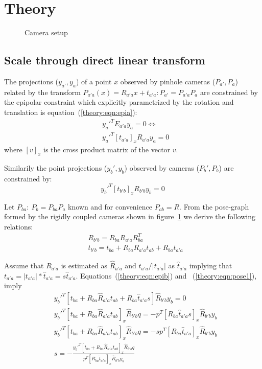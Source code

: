 \section{Theory}
\begin{figure}[t]
\centering
\def\svgwidth{\columnwidth}
\graphicspath{{images/}}

\caption{Camera setup}
\label{theory:fig:cameras}
\end{figure}


\subsection{Scale through direct linear transform}

The projections ($y_{a'},y_a$) of a point $x$ observed by pinhole cameras ($P_{a'},P_a$) related by the transform $P_{a'a}(x)=R_{a'a}x+t_{a'a} :P_{a'}=P_ {a'a}P_a$ are constrained by the epipolar constraint which explicitly parametrized by the rotation and translation is equation~(\ref{theory:eqn:epia}):
\begin{align}
\label{theory:eqn:epia}
 & y_a'^TE_{a'a}y_a =0 \iff \nonumber \\
 & y_a'^T[t_{a'a}]_xR_{a'a}y_a =0
\end{align} 
where $[v]_x$ is the cross product matrix of the vector $v$.

Similarily the point projections ($y_b',y_b$) observed by cameras ($P_b',P_b$) are constrained by: \begin{equation}
\label{theory:eqn:epib}
y_b'^T[t_{b'b}]_xR_{b'b}y_b =0
\end{equation}

Let $P_{ba}:~P_b=P_{ba}P_a$ known and for convenience $P_{ab}=R$. From the pose-graph formed by the rigidly coupled cameras shown in figure~\ref{theory:fig:cameras} we derive the following relations:
\begin{align}
\label{theory:eqn:pose1}
 & R_{b'b}=R_{ba}R_{a'a}R_{ba}^T \nonumber \\
 & t_{b'b}=t_{ba} + R_{ba}R_{a'a}t_{ab} + R_{ba}t_{a'a} 
\end{align}

Assume that $R_{a'a}$ is estimated as $\hat{R}_{a'a}$ and $t_{a'a}/|t_{a'a}|$ as $\hat{t}_{a'a}$ implying that $t_{a'a}=|t_{a'a}|*\hat{t}_{a'a} = s\hat{t}_{a'a}$. Equations~(\ref{theory:eqn:epib}) and ~(\ref{theory:eqn:pose1}), imply
\begin{align}
&y_b'^T[t_{ba} + R_{ba}\hat{R}_{a'a}t_{ab} + R_{ba}\hat{t}_{a'a}s]\hat{R}_{b'b}y_b =0  \nonumber \\ 
&y_b'^T[t_{ba} + R_{ba}\hat{R}_{a'a}t_{ab}]_x\hat{R}_{b'b}q =-p^T[R_{ba}\hat{t}_{a'a}s]_x\hat{R}_{b'b}y_b  \nonumber \\
&y_b'^T[t_{ba} + R_{ba}\hat{R}_{a'a}t_{ab}]_x\hat{R}_{b'b}q =-sp^T[R_{ba}\hat{t}_{a'a}]_x\hat{R}_{b'b}y_b \nonumber \\
&s=-\frac{y_b'^T[t_{ba} + R_{ba}\hat{R}_{a'a}t_{ab}]_x\hat{R}_{b'b}q}{p^T[R_{ba}\hat{t}_{a'a}]_x\hat{R}_{b'b}y_b}
\end{align}


